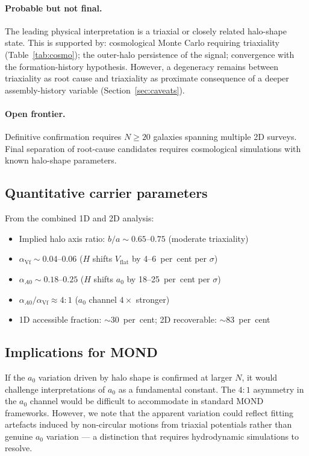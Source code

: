 \documentclass[fleqn,usenatbib]{mnras}
\newcommand{\vflat}{V_\mathrm{flat}}
\newcommand{\azero}{a_0}
\begin{document}
\paragraph{Probable but not final.}
The leading physical interpretation is a triaxial or closely related halo-shape state.
This is supported by: cosmological Monte Carlo requiring triaxiality (Table~\ref{tab:cosmo}); the outer-halo persistence of the signal; convergence with the formation-history hypothesis.
However, a degeneracy remains between triaxiality as root cause and triaxiality as proximate consequence of a deeper assembly-history variable (Section~\ref{sec:caveats}).

\paragraph{Open frontier.}
Definitive confirmation requires $N \geq 20$ galaxies spanning multiple 2D surveys.
Final separation of root-cause candidates requires cosmological simulations with known halo-shape parameters.

\subsection{Quantitative carrier parameters}

From the combined 1D and 2D analysis:
\begin{itemize}
\item Implied halo axis ratio: $b/a \sim 0.65$--$0.75$ (moderate triaxiality)
\item $\alpha_\mathrm{Vf} \sim 0.04$--$0.06$ ($H$ shifts $\vflat$ by 4--6~per~cent per $\sigma$)
\item $\alpha_{A0} \sim 0.18$--$0.25$ ($H$ shifts $\azero$ by 18--25~per~cent per $\sigma$)
\item $\alpha_{A0}/\alpha_\mathrm{Vf} \approx 4{:}1$ ($\azero$ channel $4\times$ stronger)
\item 1D accessible fraction: $\sim$30~per~cent; 2D recoverable: $\sim$83~per~cent
\end{itemize}

\subsection{Implications for MOND}

If the $\azero$ variation driven by halo shape is confirmed at larger $N$, it would challenge interpretations of $\azero$ as a fundamental constant.
The $4{:}1$ asymmetry in the $\azero$ channel would be difficult to accommodate in standard MOND frameworks.
However, we note that the apparent variation could reflect fitting artefacts induced by non-circular motions from triaxial potentials rather than genuine $\azero$ variation --- a distinction that requires hydrodynamic simulations to resolve.
\end{document}
